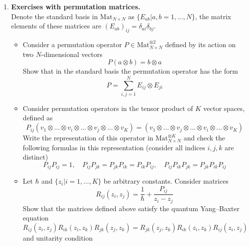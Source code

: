 \documentclass[12pt]{article}
\theoremstyle{definition}
\begin{document}
\begin{enumerate}
    \item \textbf{Exercises with permutation matrices.}\\
    Denote the standard basis in $\text{Mat}_{N\times N}$ as $\{E_{ab}|a,b = 1,...,N\}$, the matrix elements of these matrices are $(E_{ab})_{ij}= \delta_{ai}\delta_{bj}$.
    \begin{itemize}
        \item Consider a permutation operator $P\in\text{Mat}^{\otimes2}_{N\times N}$ defined by its action on two $N$-dimensional vectors
        \begin{equation}
            P(a\otimes b)=b\otimes a
        \end{equation}
        Show that in the standard basis the permutation operator has the form
        \begin{equation}
            P=\sum_{i,j=1}^{N}E_{ij}\otimes E_{ji}
        \end{equation}
        \item Consider permutation operators in the tensor product of $K$ vector spaces, defined as
        \begin{equation}
            P_{ij} (v_1 \otimes ... \otimes v_i \otimes ...\otimes v_j \otimes ... \otimes v_K)=(v_1 \otimes ... \otimes v_j \otimes ... \otimes v_i \otimes ...\otimes v_K)
        \end{equation}
        Write the representation of this operator in $\text{Mat}^{\otimes K}_{N\times N}$ and check the following formulas in this representation (consider all indices $i, j, k$ are distinct)
        \begin{equation}
            P_{ij} P_{ij} = 1,\quad P_{ij}P_{jk} = P_{jk}P_{ik} = P_{ik}P_{ij},\quad P_{ij}P_{ik}P_{jk} = P_{jk}P_{ik}P_{ij}
        \end{equation}
        \item Let $\hbar$ and $\{z_i | i = 1,...,K\}$ be arbitrary constants. Consider matrices
        \begin{equation}
            R_{ij}(z_i,z_j)=\frac{1}{\hbar} +\frac{P_{ij}}{z_i-z_j}
        \end{equation}
        Show that the matrices defined above satisfy the quantum Yang–Baxter equation
        \begin{equation}
            R_{ij}(z_i,z_j)R_{ik}(z_i,z_k)R_{jk}(z_j ,z_k) = R_{jk}(z_j,z_k)R_{ik}(z_i, z_k)R_{ij}(z_i,z_j)
        \end{equation}
        and unitarity condition
        \begin{equation}

\end{equation}
\end{itemize}
\end{enumerate}
\end{document}
